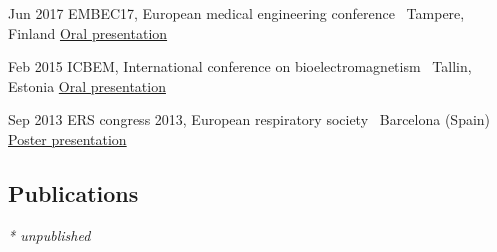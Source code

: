\documentclass[letterpaper]{twentysecondcv} %
\begin{document}
\begin{RigthPage2}
\begin{twenty}
	\twentyitem
    	{Jun 2017}
        {EMBEC17, European medical engineering conference~\cite{nlpf}}
        {Tampere, Finland}
        {\href{https://www.slideshare.net/slideshow/embed_code/key/34qLaFcP2gR6ji}{Oral presentation}}
      

	\twentyitem
    	{Feb 2015}
        {ICBEM, International conference on bioelectromagnetism~\cite{iosc}}
        {Tallin, Estonia}
         {\href{https://www.slideshare.net/slideshow/embed_code/key/bRO5NrltJZFizD}{Oral presentation} }       
               

	\twentyitem
    	{Sep 2013}
        {ERS congress 2013, European respiratory society~\cite{iosers}}
        {Barcelona (Spain)}
        {\href{http://www.ers-education.org/Media/Media.aspx?idMedia=228641}{Poster presentation}  }      
        
        
\end{twenty}    
\end{RigthPage2}
      
        


\begin{downPubli}

\section{Publications}

\nocite{*}

\printbibliography[heading=none,title={}]

\begin{flushright}
\textit{* unpublished}
\end{flushright}
\end{downPubli}
\end{document}
